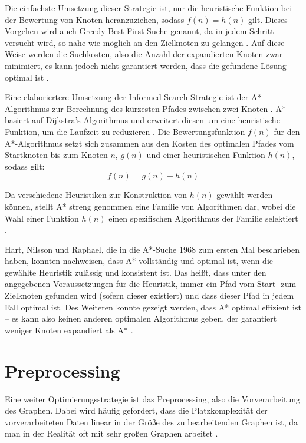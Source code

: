 Die einfachste Umsetzung dieser Strategie ist, nur die heuristische Funktion bei der Bewertung von Knoten heranzuziehen, sodass $f(n)=h(n)$ gilt. Dieses Vorgehen wird auch Greedy Best-First Suche genannt, da in jedem Schritt versucht wird, so nahe wie möglich an den Zielknoten zu gelangen \cite{Russel2010}. Auf diese Weise werden die Suchkosten, also die Anzahl der expandierten Knoten zwar minimiert, es kann jedoch nicht garantiert werden, dass die gefundene Lösung optimal ist \cite{Russel2010}.

Eine elaboriertere Umsetzung der Informed Search Strategie ist der A* Algorithmus zur Berechnung des kürzesten Pfades zwischen zwei Knoten \cite{Russel2010}. A* basiert auf Dijkstra’s Algorithmus und erweitert diesen um eine heuristische Funktion, um die Laufzeit zu reduzieren \cite{Peralta2020}. Die Bewertungsfunktion $f(n)$ für den A*-Algorithmus setzt sich zusammen aus den Kosten des optimalen Pfades vom Startknoten bis zum Knoten $n$, $g(n)$ und einer heuristischen Funktion $h(n)$, sodass gilt:
\begin{equation} \label{eq:3.1}
	f(n)=g(n)+h(n)
\end{equation}

Da verschiedene Heuristiken zur Konstruktion von $h(n)$ gewählt werden können, stellt A* streng genommen eine Familie von Algorithmen dar, wobei die Wahl einer Funktion $h(n)$ einen spezifischen Algorithmus der Familie selektiert \cite{Hart1968}. 

Hart, Nilsson und Raphael, die in \cite{Hart1968} die A*-Suche 1968 zum ersten Mal beschrieben haben, konnten nachweisen, dass A* vollständig und optimal ist, wenn die gewählte Heuristik zulässig und konsistent ist. Das heißt, dass unter den angegebenen Voraussetzungen für die Heuristik, immer ein Pfad vom Start- zum Zielknoten gefunden wird (sofern dieser existiert) und dass dieser Pfad in jedem Fall optimal ist. Des Weiteren konnte gezeigt werden, dass A* optimal effizient ist – es kann also keinen anderen optimalen Algorithmus geben, der garantiert weniger Knoten expandiert als A* \cite{Russel2010}.

\section{Preprocessing}
Eine weiter Optimierungsstrategie ist das Preprocessing, also die Vorverarbeitung des Graphen. Dabei wird häufig gefordert, dass die Platzkomplexität der vorverarbeiteten Daten linear in der Größe des zu bearbeitenden Graphen ist, da man in der Realität oft mit sehr großen Graphen arbeitet \cite{Goldberg2005}. 

